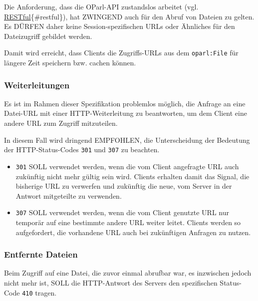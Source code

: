 \documentclass[,a4paper]{article}
\begin{document}
Die Anforderung, dass die OParl-API zustandslos arbeitet (vgl.
\hyperref[restful]{RESTful}\{\#restful\}), hat ZWINGEND auch für den
Abruf von Dateien zu gelten. Es DÜRFEN daher keine Session-spezifischen
URLs oder Ähnliches für den Dateizugriff gebildet werden.

Damit wird erreicht, dass Clients die Zugriffs-URLs aus dem
\texttt{oparl:File} für längere Zeit speichern bzw. cachen können.

\subsubsection{Weiterleitungen}\label{weiterleitungen}

Es ist im Rahmen dieser Spezifikation problemlos möglich, die Anfrage an
eine Datei-URL mit einer HTTP-Weiterleitung zu beantworten, um dem
Client eine andere URL zum Zugriff mitzuteilen.

In diesem Fall wird dringend EMPFOHLEN, die Unterscheidung der Bedeutung
der HTTP-Status-Codes \texttt{301} und \texttt{307} zu beachten.

\begin{itemize}
\item
  \texttt{301} SOLL verwendet werden, wenn die vom Client angefragte URL
  auch zukünftig nicht mehr gültig sein wird. Clients erhalten damit das
  Signal, die bisherige URL zu verwerfen und zukünftig die neue, vom
  Server in der Antwort mitgeteilte zu verwenden.
\item
  \texttt{307} SOLL verwendet werden, wenn die vom Client genutzte URL
  nur temporär auf eine bestimmte andere URL weiter leitet. Clients
  werden so aufgefordert, die vorhandene URL auch bei zukünftigen
  Anfragen zu nutzen.
\end{itemize}

\subsubsection{Entfernte Dateien}\label{entfernte-dateien}

Beim Zugriff auf eine Datei, die zuvor einmal abrufbar war, es
inzwischen jedoch nicht mehr ist, SOLL die HTTP-Antwort des Servers den
spezifischen Status-Code \texttt{410} tragen.

\end{document}
